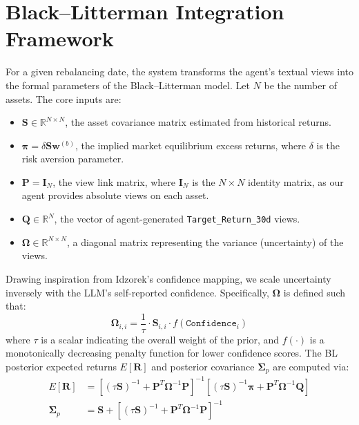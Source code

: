 \documentclass[12pt]{report}
\begin{document}
\section{Black--Litterman Integration Framework}
For a given rebalancing date, the system transforms the agent's textual views into the formal parameters of the Black--Litterman model. Let $N$ be the number of assets. The core inputs are:
\begin{itemize}
    \item $\mathbf{S} \in \mathbb{R}^{N \times N}$, the asset covariance matrix estimated from historical returns.
    \item $\mathbf{\pi} = \delta \mathbf{S} \mathbf{w}^{(b)}$, the implied market equilibrium excess returns, where $\delta$ is the risk aversion parameter.
    \item $\mathbf{P} = \mathbf{I}_{N}$, the view link matrix, where $\mathbf{I}_N$ is the $N \times N$ identity matrix, as our agent provides absolute views on each asset.
    \item $\mathbf{Q} \in \mathbb{R}^{N}$, the vector of agent-generated \texttt{Target\_Return\_30d} views.
    \item $\mathbf{\Omega} \in \mathbb{R}^{N \times N}$, a diagonal matrix representing the variance (uncertainty) of the views.
\end{itemize}

Drawing inspiration from Idzorek's confidence mapping, we scale uncertainty inversely with the LLM's self-reported confidence. Specifically, $\mathbf{\Omega}$ is defined such that:
\begin{equation}
    \mathbf{\Omega}_{i,i} = \frac{1}{\tau} \cdot \mathbf{S}_{i,i} \cdot f(\texttt{Confidence}_i)
\end{equation}
where $\tau$ is a scalar indicating the overall weight of the prior, and $f(\cdot)$ is a monotonically decreasing penalty function for lower confidence scores.
The BL posterior expected returns $E[\mathbf{R}]$ and posterior covariance $\mathbf{\Sigma}_p$ are computed via:
\begin{align}
    E[\mathbf{R}]     & = \left[ (\tau \mathbf{S})^{-1} + \mathbf{P}^T \mathbf{\Omega}^{-1} \mathbf{P} \right]^{-1} \left[ (\tau \mathbf{S})^{-1}\mathbf{\pi} + \mathbf{P}^T \mathbf{\Omega}^{-1} \mathbf{Q} \right] \\
    \mathbf{\Sigma}_p & = \mathbf{S} + \left[ (\tau \mathbf{S})^{-1} + \mathbf{P}^T \mathbf{\Omega}^{-1} \mathbf{P} \right]^{-1}
\end{align}
\end{document}
